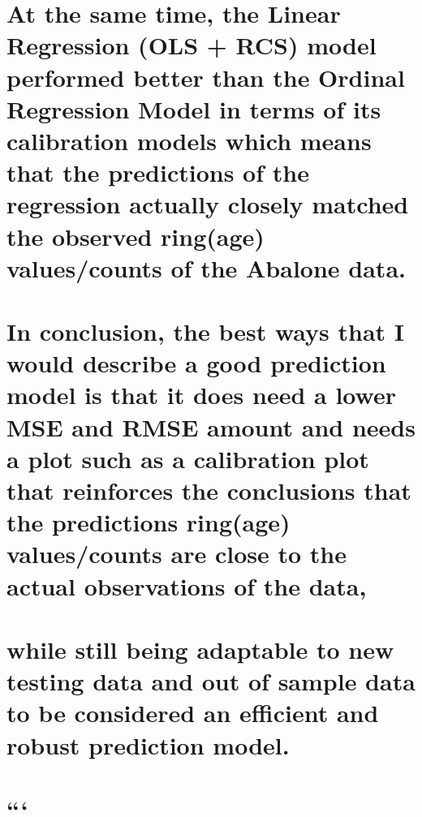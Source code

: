 \documentclass[
  letterpaper,
  DIV=11,
  numbers=noendperiod]{scrreprt}
\begin{document}
{

\chapter{At the same time, the Linear Regression (OLS + RCS) model
performed better than the Ordinal Regression Model in terms of its
calibration models which means that the predictions of the regression
actually closely matched the observed ring(age) values/counts of the
Abalone
data.}\label{at-the-same-time-the-linear-regression-ols-rcs-model-performed-better-than-the-ordinal-regression-model-in-terms-of-its-calibration-models-which-means-that-the-predictions-of-the-regression-actually-closely-matched-the-observed-ringage-valuescounts-of-the-abalone-data.}


\chapter{In conclusion, the best ways that I would describe a good
prediction model is that it does need a lower MSE and RMSE amount and
needs a plot such as a calibration plot that reinforces the conclusions
that the predictions ring(age) values/counts are close to the actual
observations of the
data,}\label{in-conclusion-the-best-ways-that-i-would-describe-a-good-prediction-model-is-that-it-does-need-a-lower-mse-and-rmse-amount-and-needs-a-plot-such-as-a-calibration-plot-that-reinforces-the-conclusions-that-the-predictions-ringage-valuescounts-are-close-to-the-actual-observations-of-the-data}


\chapter{while still being adaptable to new testing data and out of
sample data to be considered an efficient and robust prediction
model.}\label{while-still-being-adaptable-to-new-testing-data-and-out-of-sample-data-to-be-considered-an-efficient-and-robust-prediction-model.}


\chapter{```}\label{section-24}


}
\end{document}
